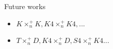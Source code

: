 \begin{frame}{Future works}
	\begin{itemize}
		\item $K \times_n^+ K, K4 \times_n^+K4, ...$	\pause	
		\item $T \times_n^+ D, K4 \times_n^+ D, S4 \times_n^+ K4...$
	\end{itemize}
\end{frame}

